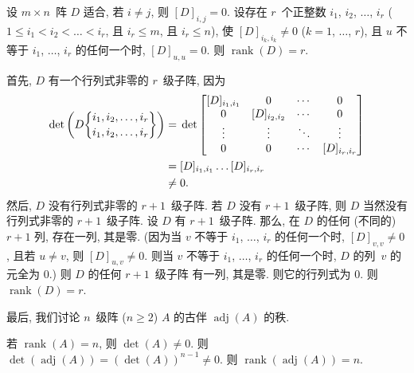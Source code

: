 \documentclass[../libro.tex]{subfiles}
\begin{document}
\begin{example}
    设 \(m \times n\)~阵 \(D\) 适合,
    若 \(i \neq j\), 则 \([D]_{i,j} = 0\).
    设存在 \(r\)~个正整数
    \(i_1\), \(i_2\), \(\dots\), \(i_r\)
    (\(1 \leq i_1 < i_2 < \dots < i_r\),
    且 \(i_r \leq m\), 且 \(i_r \leq n\)),
    使 \([D]_{i_k,i_k} \neq 0\)
    (\(k = 1\), \(\dots\), \(r\)),
    且 \(u\) 不等于 \(i_1\), \(\dots\), \(i_r\)
    的任何一个时, \([D]_{u,u} = 0\).
    则 \(\operatorname{rank} {(D)} = r\).

    首先, \(D\) 有一个行列式非零的 \(r\)~级子阵,
    因为
    \begin{align*}
        \det {\left(
                D\submat{i_1,i_2,\dots,i_r}{i_1,i_2,\dots,i_r}
        \right)}
        = {} &
        \det {
            \begin{bmatrix}
                [D]_{i_1,i_1} & 0             & \cdots & 0             \\
                0             & [D]_{i_2,i_2} & \cdots & 0             \\
                \vdots        & \vdots        & \ddots & \vdots        \\
                0             & 0             & \cdots & [D]_{i_r,i_r} \\
            \end{bmatrix}
        }
        \\
        = {} &
        [D]_{i_1,i_1} \dots [D]_{i_r,i_r}
        \\
        \neq {} &
        0.
    \end{align*}
    然后, \(D\) 没有行列式非零的 \(r + 1\)~级子阵.
    若 \(D\) 没有 \(r + 1\)~级子阵,
    则 \(D\) 当然没有行列式非零的 \(r + 1\)~级子阵.
    设 \(D\) 有 \(r + 1\)~级子阵.
    那么, 在 \(D\) 的任何 (不同的) \(r + 1\) 列,
    存在一列, 其是零.
    (因为当 \(v\) 不等于 %
    \(i_1\), \(\dots\), \(i_r\)
    的任何一个时,
    \([D]_{v,v} \neq 0\),
    且若 \(u \neq v\),
    则 \([D]_{u,v} \neq 0\).
    则当 \(v\) 不等于 \(i_1\), \(\dots\), \(i_r\)
    的任何一个时,
    \(D\) 的列~\(v\) 的元全为 \(0\).) %
    则 \(D\) 的任何 \(r + 1\)~级子阵%
    有一列, 其是零.
    则它的行列式为 \(0\).
    则 \(\operatorname{rank} {(D)} = r\).
\end{example}

最后, 我们讨论 \(n\)~级阵 (\(n \geq 2\)) \(A\)
的古伴 \(\operatorname{adj} {(A)}\) 的秩.

若 \(\operatorname{rank} {(A)} = n\),
则 \(\det {(A)} \neq 0\).
则 \(\det {(\operatorname{adj} {(A)})}
= (\det {(A)})^{n-1} \neq 0\).
则 \(\operatorname{rank} {(\operatorname{adj} {(A)})} = n\).
\end{document}
